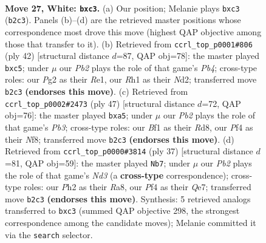 \documentclass[11pt]{article}
\begin{document}
\clearpage

\begin{figure}[p]\centering
\begin{subfigure}{0.46\textwidth}\centering
\resizebox{\linewidth}{!}{%
\newchessgame
\chessboard[
  setfen={1n3rk1/1rqb1ppp/8/4Pp2/p4P2/2p5/PPP2KPP/1R2QBNR w - - 0 27},
  showmover=false,
  pgfstyle=straightmove, color=movearrow, markmove={b2-c3}
]}
\caption{}
\end{subfigure}\hfill
\begin{subfigure}{0.46\textwidth}\centering
\resizebox{\linewidth}{!}{%
\newchessgame
\chessboard[
  setfen={r1b1r1k1/ppp1qppp/5n2/2p5/1P6/P1Q1P1P1/3NBPP1/2R1R1K1 w - - 0 22},
  showmover=false,
  pgfstyle=straightmove, color=movearrow, markmove={b4-c5}
]}
\caption{}
\end{subfigure}
\\[4pt]
\begin{subfigure}{0.46\textwidth}\centering
\resizebox{\linewidth}{!}{%
\newchessgame
\chessboard[
  setfen={3r1nk1/pb2rp1p/1p6/P2q4/3P1p2/3B1P2/5QPP/R2R1NK1 b - - 0 24},
  showmover=false,
  pgfstyle=straightmove, color=movearrow, markmove={b6-a5}
]}
\caption{}
\end{subfigure}\hfill
\begin{subfigure}{0.46\textwidth}\centering
\resizebox{\linewidth}{!}{%
\newchessgame
\chessboard[
  setfen={r2r2k1/4qppp/b1pnp3/p7/N1P2P2/1B6/PP1RQ1PP/2K4R b - - 1 19},
  showmover=false,
  pgfstyle=straightmove, color=movearrow, markmove={d6-b7}
]}
\caption{}
\end{subfigure}
\caption{\textbf{Move 27, White: \texttt{bxc3}.} (a) Our position; Melanie plays \texttt{bxc3} (\texttt{b2c3}). Panels (b)--(d) are the retrieved master positions whose correspondence most drove this move (highest QAP objective among those that transfer to it). (b) Retrieved from \texttt{ccrl\_top\_p0001\#806} (ply 42) [structural distance $d$=87, QAP obj=78]: the master played \texttt{bxc5}; under $\mu$ our \emph{Pb2} plays the role of that game's \emph{Pb4}; cross-type roles: our \emph{P}g2 as their \emph{R}e1, our \emph{R}h1 as their \emph{N}d2; transferred move \texttt{b2c3} \textbf{(endorses this move)}. (c) Retrieved from \texttt{ccrl\_top\_p0002\#2473} (ply 47) [structural distance $d$=72, QAP obj=76]: the master played \texttt{bxa5}; under $\mu$ our \emph{Pb2} plays the role of that game's \emph{Pb3}; cross-type roles: our \emph{B}f1 as their \emph{R}d8, our \emph{P}f4 as their \emph{N}f8; transferred move \texttt{b2c3} \textbf{(endorses this move)}. (d) Retrieved from \texttt{ccrl\_top\_p0000\#3814} (ply 37) [structural distance $d$=81, QAP obj=59]: the master played \texttt{Nb7}; under $\mu$ our \emph{Pb2} plays the role of that game's \emph{Nd3} (a \textbf{cross-type} correspondence); cross-type roles: our \emph{P}h2 as their \emph{R}a8, our \emph{P}f4 as their \emph{Q}e7; transferred move \texttt{b2c3} \textbf{(endorses this move)}. Synthesis: 5 retrieved analogs transferred to \texttt{bxc3} (summed QAP objective 298, the strongest correspondence among the candidate moves); Melanie committed it via the \texttt{search} selector.}
\label{fig:thought-m52}
\end{figure}
\end{document}
